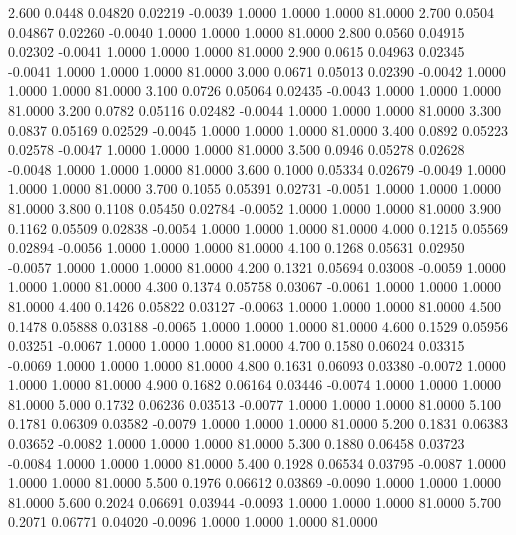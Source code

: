    2.600   0.0448   0.04820   0.02219  -0.0039   1.0000   1.0000   1.0000  81.0000
   2.700   0.0504   0.04867   0.02260  -0.0040   1.0000   1.0000   1.0000  81.0000
   2.800   0.0560   0.04915   0.02302  -0.0041   1.0000   1.0000   1.0000  81.0000
   2.900   0.0615   0.04963   0.02345  -0.0041   1.0000   1.0000   1.0000  81.0000
   3.000   0.0671   0.05013   0.02390  -0.0042   1.0000   1.0000   1.0000  81.0000
   3.100   0.0726   0.05064   0.02435  -0.0043   1.0000   1.0000   1.0000  81.0000
   3.200   0.0782   0.05116   0.02482  -0.0044   1.0000   1.0000   1.0000  81.0000
   3.300   0.0837   0.05169   0.02529  -0.0045   1.0000   1.0000   1.0000  81.0000
   3.400   0.0892   0.05223   0.02578  -0.0047   1.0000   1.0000   1.0000  81.0000
   3.500   0.0946   0.05278   0.02628  -0.0048   1.0000   1.0000   1.0000  81.0000
   3.600   0.1000   0.05334   0.02679  -0.0049   1.0000   1.0000   1.0000  81.0000
   3.700   0.1055   0.05391   0.02731  -0.0051   1.0000   1.0000   1.0000  81.0000
   3.800   0.1108   0.05450   0.02784  -0.0052   1.0000   1.0000   1.0000  81.0000
   3.900   0.1162   0.05509   0.02838  -0.0054   1.0000   1.0000   1.0000  81.0000
   4.000   0.1215   0.05569   0.02894  -0.0056   1.0000   1.0000   1.0000  81.0000
   4.100   0.1268   0.05631   0.02950  -0.0057   1.0000   1.0000   1.0000  81.0000
   4.200   0.1321   0.05694   0.03008  -0.0059   1.0000   1.0000   1.0000  81.0000
   4.300   0.1374   0.05758   0.03067  -0.0061   1.0000   1.0000   1.0000  81.0000
   4.400   0.1426   0.05822   0.03127  -0.0063   1.0000   1.0000   1.0000  81.0000
   4.500   0.1478   0.05888   0.03188  -0.0065   1.0000   1.0000   1.0000  81.0000
   4.600   0.1529   0.05956   0.03251  -0.0067   1.0000   1.0000   1.0000  81.0000
   4.700   0.1580   0.06024   0.03315  -0.0069   1.0000   1.0000   1.0000  81.0000
   4.800   0.1631   0.06093   0.03380  -0.0072   1.0000   1.0000   1.0000  81.0000
   4.900   0.1682   0.06164   0.03446  -0.0074   1.0000   1.0000   1.0000  81.0000
   5.000   0.1732   0.06236   0.03513  -0.0077   1.0000   1.0000   1.0000  81.0000
   5.100   0.1781   0.06309   0.03582  -0.0079   1.0000   1.0000   1.0000  81.0000
   5.200   0.1831   0.06383   0.03652  -0.0082   1.0000   1.0000   1.0000  81.0000
   5.300   0.1880   0.06458   0.03723  -0.0084   1.0000   1.0000   1.0000  81.0000
   5.400   0.1928   0.06534   0.03795  -0.0087   1.0000   1.0000   1.0000  81.0000
   5.500   0.1976   0.06612   0.03869  -0.0090   1.0000   1.0000   1.0000  81.0000
   5.600   0.2024   0.06691   0.03944  -0.0093   1.0000   1.0000   1.0000  81.0000
   5.700   0.2071   0.06771   0.04020  -0.0096   1.0000   1.0000   1.0000  81.0000

